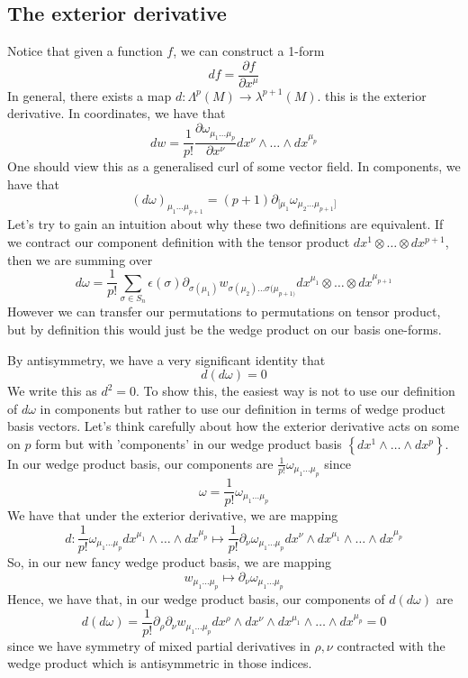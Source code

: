 \subsection{The exterior derivative} 
Notice that given a function $ f$, we can construct a  1-form 
\[
df = \frac{\partial f }{\partial  x^{ \mu} } 
\] In general, there exists a map 
$ d : \Lambda^ p ( M ) \to \lambda^{ p + 1 } (  M ) $. 
this is the exterior derivative. In coordinates, 
we have that 
\[
dw = \frac{1}{ p ! } \frac{\partial \omega_{ \mu_1 \dots \mu_{ p  } }}{\partial x^\nu} dx^\nu \wedge  \dots \wedge  dx^{ \mu_{ p }} 
\] One should view this as a 
generalised curl of some vector field. 
In components, we have that 
\[
( d \omega  ) _{ \mu_1 \dots \mu_{ p + 1  }} = ( p +  1) \partial_{ [ \mu_1 } \omega_{ \mu_2 \dots \mu_{ p + 1 }]  }
\] Let's try to gain an intuition about 
why these two definitions are equivalent.
If we contract our component definition with the tensor 
product $ dx^ 1 \otimes \dots \otimes dx^{p +1}$, 
then we are summing over 
\[
	d \omega = \frac{1}{p ! } \sum_{ \sigma \in S_ n } \epsilon ( \sigma)  \partial_{ \sigma ( \mu_ 1 ) } w_{ \sigma ( \mu _ 2 )  \dots \sigma ( \mu _{ p + 1 ) }} dx^{ \mu _ 1 } \otimes \dots \otimes dx^{ \mu _{ p +1}}
\] However we can transfer our 
permutations to permutations on tensor product, 
but by definition this would just be the 
wedge product on our basis one-forms. 

By antisymmetry,  we have a very significant identity that 
\[
d ( d \omega  ) = 0 
\] We write this as $ d^ 2 = 0 $.
To show this, the easiest way is not to use our 
definition of $ d \omega  $ in components but 
rather to use our definition in terms of wedge product 
basis vectors. Let's think carefully about how the exterior 
derivative acts on some on $ p $ form but with 'components' 
in our wedge product basis $ \left\{  dx^1 \wedge  \dots \wedge  dx^p \right\}  $. 
In our wedge product basis, our components are $ \frac{1}{p !} \omega_{ \mu_ 1 \dots \mu _{ p } } $ since 
\[
	\omega = \frac{1}{p!} \omega_{ \mu_1 \dots \mu_{ p } }
\] We have that under the exterior derivative, we are mapping 
\[
 d : \frac{1}{p!} \omega_{ \mu_ 1 \dots \mu_ p } dx^{ \mu _ 1 } \wedge  \dots \wedge dx ^{ \mu_ p } \mapsto \frac{1}{p!} \partial_\nu \omega_{ \mu _1 \dots \mu _ p } dx^ \nu \wedge dx^{ \mu _ 1 } \wedge  \dots \wedge  dx^{ \mu _ p } 
\] So, in our new fancy wedge product basis, we are mapping 
 \[
 w_{ \mu_1 \dots \mu_{ p }} \mapsto \partial _ \nu \omega_{ \mu _ 1 \dots \mu _{ p } }
\] 
Hence, we have that, in our wedge product basis, our components of 
$ d ( d \omega ) $ are 
\[
d ( d \omega ) = \frac{1}{p ! } \partial _ \rho \partial  _ \nu w_{ \mu _ 1 \dots \mu _ p } dx^ \rho \wedge  dx ^ \nu \wedge  dx ^{ \mu _ 1 } \wedge  \dots \wedge  dx^{\mu _ p } = 0 
\] since we have symmetry of mixed 
partial derivatives in $ \rho , \nu $ contracted 
with the wedge product which is antisymmetric in those 
indices.

